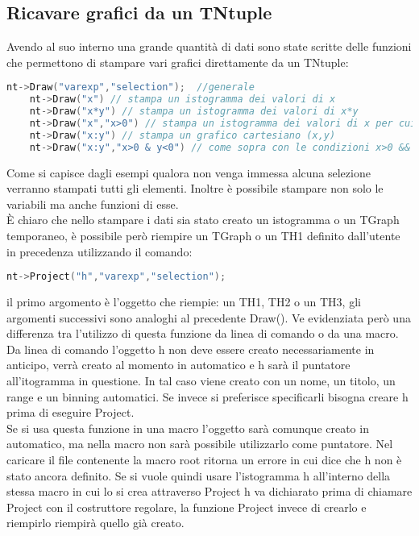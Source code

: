 \subsection{Ricavare grafici da un TNtuple}
Avendo al suo interno una grande quantità di dati sono state scritte delle funzioni che permettono di stampare vari grafici direttamente da un TNtuple:
\begin{lstlisting}[language=C++,label={cod1},mathescape=true,breaklines=true]
	nt->Draw("varexp","selection");  //generale
	nt->Draw("x") // stampa un istogramma dei valori di x
	nt->Draw("x*y") // stampa un istogramma dei valori di x*y
	nt->Draw("x","x>0") // stampa un istogramma dei valori di x per cui x>0
	nt->Draw("x:y") // stampa un grafico cartesiano (x,y)
	nt->Draw("x:y","x>0 & y<0") // come sopra con le condizioni x>0 && y<0
\end{lstlisting}
Come si capisce dagli esempi qualora non venga immessa alcuna selezione verranno stampati tutti gli elementi. Inoltre è possibile stampare non solo le variabili ma anche funzioni di esse.\\
È chiaro che nello stampare i dati sia stato creato un istogramma o un TGraph temporaneo, è possibile però riempire un TGraph o un TH1 definito dall'utente in precedenza utilizzando il comando:
\begin{lstlisting}[language=C++,label={cod1},mathescape=true,breaklines=true]
	nt->Project("h","varexp","selection");
\end{lstlisting}
il primo argomento è l'oggetto che riempie: un TH1, TH2 o un TH3, gli argomenti successivi sono analoghi al precedente Draw(). Ve evidenziata però una differenza tra l'utilizzo di questa funzione da linea di comando o da una macro. Da linea di comando l'oggetto h non deve essere creato necessariamente in anticipo, verrà creato al momento in automatico e h sarà il puntatore all'itogramma in questione. In tal caso viene creato con un nome, un titolo, un range e un binning automatici. Se invece si preferisce specificarli bisogna creare h prima di eseguire Project.\\
Se si usa questa funzione in una macro l'oggetto sarà comunque creato in automatico, ma nella macro non sarà possibile utilizzarlo come puntatore. Nel caricare il file contenente la macro root ritorna un errore in cui dice che h non è stato ancora definito. Se si vuole quindi usare l'istogramma h all'interno della stessa macro in cui lo si crea attraverso Project h va dichiarato prima di chiamare Project con il costruttore regolare, la funzione Project invece di crearlo e riempirlo riempirà quello già creato.\\
